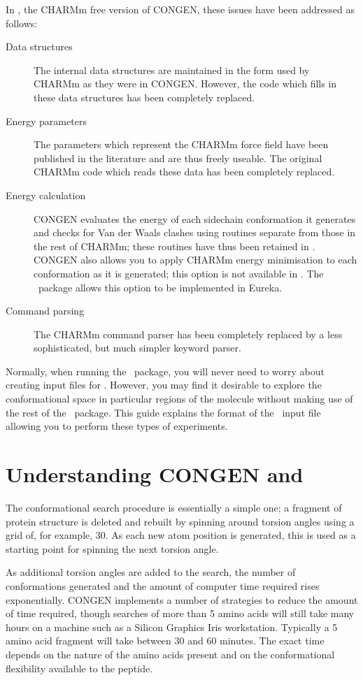 In \cs, the CHARMm free version of CONGEN, these issues have been addressed
as follows:
\begin{description}
\item[Data structures] The internal data structures are maintained in
the form used by CHARMm as they were in CONGEN. However, the code which 
fills in these data structures has been completely replaced.
\item[Energy parameters] The parameters which represent the CHARMm force
field have been published in the literature and are thus freely useable.
The original CHARMm code which reads these data has been completely replaced.
\item[Energy calculation] CONGEN evaluates the energy of each sidechain
conformation it generates and checks for Van der Waals clashes using 
routines separate from those in the rest of
CHARMm; these routines have thus been retained in \cs. 
CONGEN also allows
you to apply CHARMm energy minimisation to each conformation as it is 
generated; this option is not available in \cs. The \abm\ package allows
this option to be implemented in Eureka.
\item[Command parsing] The CHARMm command parser has been completely
replaced by a less sophisticated, but much simpler keyword parser.
\end{description}

Normally, when running the \abm\ package, you will never need to worry
about creating input files for \cs. However, you may find it desirable to
explore the conformational space in particular regions of the molecule
without making use of the rest of the \abm\ package. This guide explains the
format of the \cs\ input file allowing you to perform these types of
experiments.

\section{Understanding CONGEN and \cs}
\label{sec:understanding}
The conformational search procedure is essentially a simple one; a fragment
of protein structure is deleted and rebuilt by spinning around torsion
angles using a grid of, for example, 30\degree. As each new atom
position is generated, this is used as a starting point for spinning the
next torsion angle.

As additional torsion angles are added to the search, the number of 
conformations
generated and the amount of computer time required rises exponentially.
CONGEN implements a number of strategies to reduce the amount of time
required, though searches of more than 5 amino acids will still take
many hours on a machine such as a Silicon Graphics Iris workstation.
Typically a 5 amino acid fragment will take between 30 and 60 minutes. The
exact time depends on the nature of the amino acids present and on the
conformational flexibility available to the peptide.

